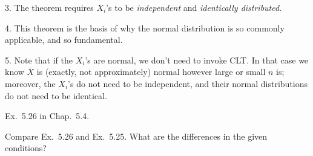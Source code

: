 \documentclass[12pt]{article}
\begin{document}
3. The theorem requires $X_i$'s to be \emph{independent} and
\emph{identically distributed}.

4. This theorem is the basis of why the normal distribution is so
commonly applicable, and so fundamental.

5. Note that if the $X_i$'s are normal, we don't need to invoke CLT.
In that case we know $\overline{X}$ is (exactly, not approximately)
normal however large or small $n$ is;
moreover, the $X_i$'s do not need to be independent,
and their normal distributions do not need to be identical.

\example
Ex.~5.26 in Chap.~5.4.

\exercise
Compare Ex.~5.26 and Ex.~5.25. What are the differences in the given
conditions?
\end{document}
